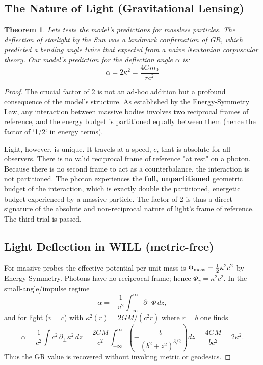 \documentclass[12pt, a4paper]{article}
\newtheorem{theorem}{Theorem}[section]
\begin{document}
\subsection{The Nature of Light (Gravitational Lensing)}
\begin{theorem}
Lets tests the model's predictions for massless particles. The deflection of starlight by the Sun was a landmark confirmation of GR, which predicted a bending angle twice that expected from a naive Newtonian corpuscular theory. Our model's prediction for the deflection angle \(\alpha\) is:
\begin{equation}
    \alpha = 2\kappa^2 = \frac{4Gm_0}{rc^2}
\end{equation}
\end{theorem}
\begin{proof}
The crucial factor of 2 is not an ad-hoc addition but a profound consequence of the model's structure. As established by the Energy-Symmetry Law, any interaction between massive bodies involves two reciprocal frames of reference, and the energy budget is partitioned equally between them (hence the factor of `1/2` in energy terms).

Light, however, is unique. It travels at a speed, \(c\), that is absolute for all observers. There is no valid reciprocal frame of reference "at rest" on a photon. Because there is no second frame to act as a counterbalance, the interaction is not partitioned. The photon experiences the \textbf{full, unpartitioned} geometric budget of the interaction, which is exactly double the partitioned, energetic budget experienced by a massive particle. The factor of 2 is thus a direct signature of the absolute and non-reciprocal nature of light's frame of reference. The third trial is passed.

\subsection*{Light Deflection in WILL (metric-free)}
For massive probes the effective potential per unit mass is 
$\Phi_{\rm mass}=\tfrac12\kappa^2 c^2$ by Energy Symmetry. 
Photons have no reciprocal frame; hence $\Phi_\gamma=\kappa^2 c^2$.
In the small-angle/impulse regime
\[
\alpha = -\frac{1}{v^2}\int_{-\infty}^{\infty}\partial_\perp \Phi\,dz,
\]
and for light ($v=c$) with $\kappa^2(r)=2GM/(c^2 r)$ where $r=b$ one finds
\[
\alpha=\frac{1}{c^2}\!\int\! c^2\,\partial_\perp \kappa^2\,dz
=\frac{2GM}{c^2}\!\int_{-\infty}^{\infty}\!\!\left(-\frac{b}{(b^2+z^2)^{3/2}}\right)dz
=\frac{4GM}{b c^2}=2\kappa^2.
\]
Thus the GR value is recovered without invoking metric or geodesics.
\end{proof}
\end{document}
